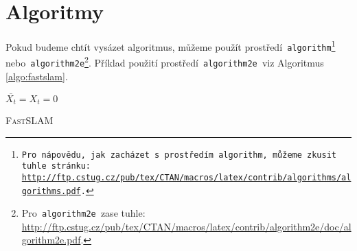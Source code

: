 \documentclass[hidelinks, 11pt, a4paper]{article}
\begin{document}
\section{Algoritmy}
\label{sec:Algoritmy}
Pokud budeme chtít vysázet algoritmus, můžeme použít prostředí\texttt{ algorithm\footnote[2]{Pro nápovědu, jak zacházet s prostředím\texttt{ algorithm,} můžeme zkusit tuhle stránku:\\
 \href{http://ftp.cstug.cz/pub/tex/CTAN/macros/latex/contrib/algorithms/algorithms.pdf}{http://ftp.cstug.cz/pub/tex/CTAN/macros/latex/contrib/algorithms/algorithms.pdf}.} }
nebo\texttt{ algorithm2e}\footnote[3]{Pro\texttt{ algorithm2e }zase tuhle: \href{http://ftp.cstug.cz/pub/tex/CTAN/macros/latex/contrib/algorithm2e/doc/algorithm2e.pdf}{http://ftp.cstug.cz/pub/tex/CTAN/macros/latex/contrib/algorithm2e/doc/algorithm2e.pdf}.}. Příklad použití prostředí\texttt{ algorithm2e }viz Algoritmus \ref{algo:fastslam}.\\

\begin{algorithm}[ht]
    \SetAlgoNoLine
    
    \SetNlSty{}{}{:}
    \SetNlSkip{-1.2em}
    \BlankLine
    \DontPrintSemicolon
    \Indentp{1.7em}
    $\overline{X_t} = X_t = 0$\;
    \caption{\textsc{FastSLAM}}
    \label{algo:fastslam}
\end{algorithm}
\end{document}
